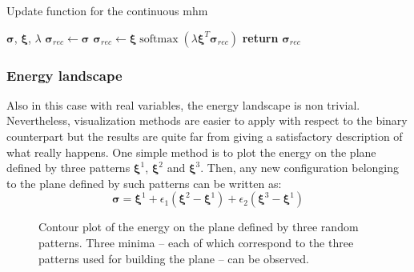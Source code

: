 \documentclass[\rootdir/main.tex]{subfiles}
\begin{document}
\begin{algorithm}
    \caption{Update function for the continuous \acrshort{mhm}}
    \label{alg:update_continuous_mhm}
    \begin{algorithmic}[1]
    \Require $\symbf{\sigma}$, $\symbf{\xi}$, $\lambda$
    \State $\symbf{\sigma}_{rec} \gets \symbf{\sigma}$
    \State $\symbf{\sigma}_{rec} \gets \symbf{\xi}  \operatorname{softmax}\left(\lambda \symbf{\xi}^T  \symbf{\sigma}_{rec}\right)$
    \State \textbf{return} $\symbf{\sigma}_{rec}$
\end{algorithmic}
\end{algorithm}

\subsubsection{Energy landscape}
Also in this case with real variables, the energy landscape is non trivial. Nevertheless, visualization methods are easier to apply with respect to the binary counterpart but the results are quite far from giving a satisfactory description of what really happens.
One simple method is to plot the energy on the plane defined by three patterns $\symbf{\xi}^1$, $\symbf{\xi}^2$ and $\symbf{\xi}^3$. Then, any new configuration belonging to the plane defined by such patterns can be written as:
\begin{equation*}
    \symbf{\sigma} = \symbf{\xi}^1 + \epsilon_1 \left(\symbf{\xi}^2 - \symbf{\xi}^1\right) + \epsilon_2 \left(\symbf{\xi}^3 - \symbf{\xi}^1\right)
\end{equation*}
\begin{figure}[hbt]
    \centering
    
    \caption{Contour plot of the energy on the plane defined by three random patterns. Three minima -- each of which correspond to the three patterns used for building the plane -- can be observed.}
\end{figure}

\subbibliography
\end{document}
